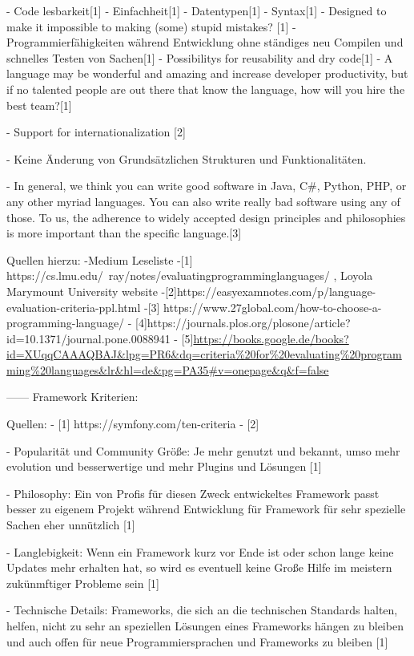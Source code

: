 - Code lesbarkeit[1]
- Einfachheit[1]
- Datentypen[1]
- Syntax[1]
- Designed to make it impossible to making (some) stupid mistakes? [1]
- Programmierfähigkeiten während Entwicklung ohne ständiges neu Compilen und schnelles Testen     von Sachen[1]
- Possibilitys for reusability and dry code[1]
- A language may be wonderful and amazing and increase developer productivity, but if no talented people are out there that know the language, how will you hire the best team?[1]

- Support for internationalization [2]

- Keine Änderung von Grundsätzlichen Strukturen und Funktionalitäten.

- In general, we think you can write good software in Java, C\#, Python, PHP, or any other myriad languages. You can also write really bad software using any of those. To us, the adherence to widely accepted design principles and philosophies is more important than the specific language.[3]



Quellen hierzu:
-Medium Leseliste
-[1] https://cs.lmu.edu/~ray/notes/evaluatingprogramminglanguages/  , Loyola Marymount University website
-[2]https://easyexamnotes.com/p/language-evaluation-criteria-ppl.html
-[3] https://www.27global.com/how-to-choose-a-programming-language/
- [4]https://journals.plos.org/plosone/article?id=10.1371/journal.pone.0088941
- [5]\url{https://books.google.de/books?id=XUqqCAAAQBAJ&lpg=PR6&dq=criteria%20for%20evaluating%20programming%20languages&lr&hl=de&pg=PA35#v=onepage&q&f=false}


------
Framework Kriterien:

Quellen:
- [1] https://symfony.com/ten-criteria
- [2]


- Popularität und Community Größe: Je mehr genutzt und bekannt, umso mehr evolution und besserwertige und mehr Plugins und Lösungen [1]

- Philosophy: Ein von Profis für diesen Zweck entwickeltes Framework passt besser zu eigenem Projekt während Entwicklung für Framework für sehr spezielle Sachen eher unnützlich [1]

- Langlebigkeit: Wenn ein Framework kurz vor Ende ist oder schon lange keine Updates mehr erhalten hat, so wird es eventuell keine Große Hilfe im meistern zukünmftiger Probleme sein [1]

- Technische Details: Frameworks, die sich an die technischen Standards halten, helfen, nicht zu sehr an speziellen Lösungen eines Frameworks hängen zu bleiben und auch offen für neue Programmiersprachen und Frameworks zu bleiben [1]

